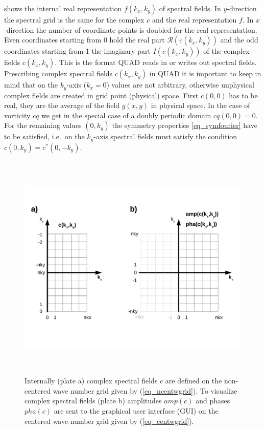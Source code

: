 shows the internal real representation $f(k_{x},k_{y})$ of spectral fields. 
In $y$-direction the spectral grid is the same for the complex $c$ and 
the real representation $f$. In $x$-direction the number of coordinate 
points is doubled for the real representation. Even coordinates starting 
from $0$ hold the real part $\mathcal{R}(c(k_{x},k_{y}))$ and       
the odd coordinates starting from 1 the imaginary part 
$I(c(k_{x},k_{y}))$ of the complex fields $c(k_{x},k_{y})$. 
This is the format QUAD reads in or writes out spectral fields.
Prescribing complex spectral fields $c(k_{x},k_{y})$ in QUAD it is important 
to keep in mind that on the $k_{y}$-axis ($k_{x} = 0$) values are not 
arbitrary, otherwise unphysical complex fields are created in grid point 
(physical) space. First $c(0,0)$ has to be real, they are the average of 
the field $g(x,y)$ in physical space. In the case of vorticity $cq$ 
we get in the special case of a doubly periodic domain $cq(0,0) = 0$. 
For the remaining values $(0,k_{y})$ the symmetry properties 
\ref{eq_symfourier} have to be satisfied, i.e.\ on the $k_{y}$-axis 
spectral fields must satisfy the condition $c(0,k_{y}) = c^{*}(0,-k_{y})$.
\begin{figure} \label{fig_cspecgrid}
   \includegraphics[height=11cm]{figures/cmplx_cent_grid.pdf}
   \caption{Internally (plate a) complex spectral fields $c$ are defined on 
            the non-centered wave number grid given by (\ref{eq_ncentwgrid}). 
            To visualize complex spectral fields (plate b) amplitudes 
            $amp(c)$ and phases $pha(c)$ are sent to the graphical user 
            interface (GUI) on the centered wave-number grid given by 
            (\ref{eq_centwgrid}).}
\end{figure}
